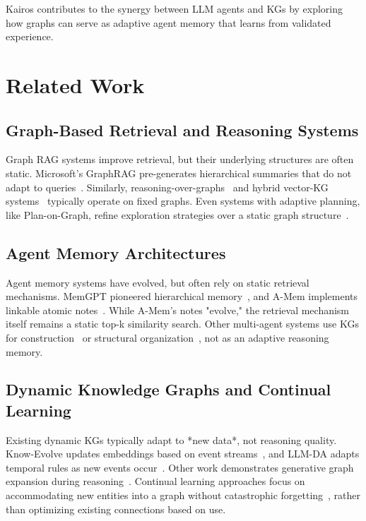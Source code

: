 \documentclass{article}
\begin{document}
Kairos contributes to the synergy between LLM agents and KGs by exploring how graphs can serve as adaptive agent memory that learns from validated experience.

\section{Related Work}

\subsection{Graph-Based Retrieval and Reasoning Systems}

Graph RAG systems improve retrieval, but their underlying structures are often static. Microsoft's GraphRAG pre-generates hierarchical summaries that do not adapt to queries~\citep{edge2024graphrag}. Similarly, reasoning-over-graphs~\citep{luo2024rog} and hybrid vector-KG systems~\citep{sarmah2024hybridrag} typically operate on fixed graphs. Even systems with adaptive planning, like Plan-on-Graph, refine exploration strategies over a static graph structure~\citep{chen2024pog}.

\subsection{Agent Memory Architectures}

Agent memory systems have evolved, but often rely on static retrieval mechanisms. MemGPT pioneered hierarchical memory~\citep{packer2023memgpt}, and A-Mem implements linkable atomic notes~\citep{xu2025amem}. While A-Mem's notes "evolve," the retrieval mechanism itself remains a static top-k similarity search. Other multi-agent systems use KGs for construction~\citep{liang2023cooperkgc} or structural organization~\citep{zhang2024graphs}, not as an adaptive reasoning memory.

\subsection{Dynamic Knowledge Graphs and Continual Learning}

Existing dynamic KGs typically adapt to *new data*, not reasoning quality. Know-Evolve updates embeddings based on event streams~\citep{trivedi2017knowevolve}, and LLM-DA adapts temporal rules as new events occur~\citep{wang2024llmda}. Other work demonstrates generative graph expansion during reasoning~\citep{buehler2025agentic}. Continual learning approaches focus on accommodating new entities into a graph without catastrophic forgetting~\citep{daruna2021continual}, rather than optimizing existing connections based on use.
\end{document}
